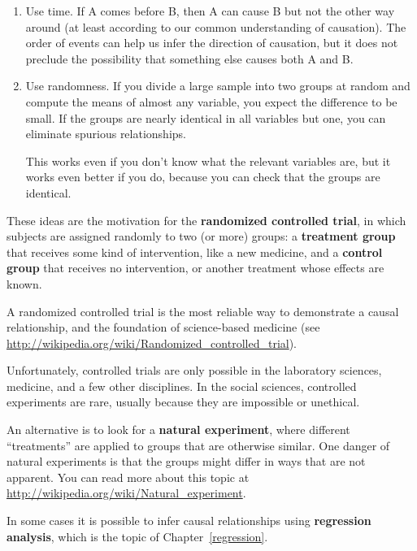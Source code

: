 \documentclass[12pt]{book}
\theoremstyle{exercise}
\begin{document}
\begin{enumerate}

\item Use time.  If A comes before B, then A can cause B but not the
  other way around (at least according to our common understanding of
  causation).  The order of events can help us infer the direction
  of causation, but it does not preclude the possibility that something
  else causes both A and B.

\item Use randomness.  If you divide a large sample into two
  groups at random and compute the means of almost any variable, you
  expect the difference to be small.
  If the groups are nearly identical in all variables but one, you
  can eliminate spurious relationships.%

  This works even if you don't know what the relevant variables
  are, but it works even better if you do, because you can check that
  the groups are identical.

\end{enumerate}

These ideas are the motivation for the {\bf randomized controlled
trial}, in which subjects are assigned randomly to two (or more)
groups: a {\bf treatment group} that receives some kind of intervention,
like a new medicine, and a {\bf control group} that receives
no intervention, or another treatment whose effects are known.%
%
%
%
%

A randomized controlled trial is the most reliable way to demonstrate
a causal relationship, and the foundation of science-based medicine
(see \url{http://wikipedia.org/wiki/Randomized_controlled_trial}).

Unfortunately, controlled trials are only possible in the laboratory
sciences, medicine, and a few other disciplines.  In the social sciences,
controlled experiments are rare, usually because they are impossible
or unethical.%

An alternative is to look for a {\bf natural experiment}, where
different ``treatments'' are applied to groups that are otherwise
similar.  One danger of natural experiments is that the groups might
differ in ways that are not apparent.  You can read more about this
topic at \url{http://wikipedia.org/wiki/Natural_experiment}.%

In some cases it is possible to infer causal relationships using {\bf
  regression analysis}, which is the topic of Chapter~\ref{regression}.%
\end{document}
